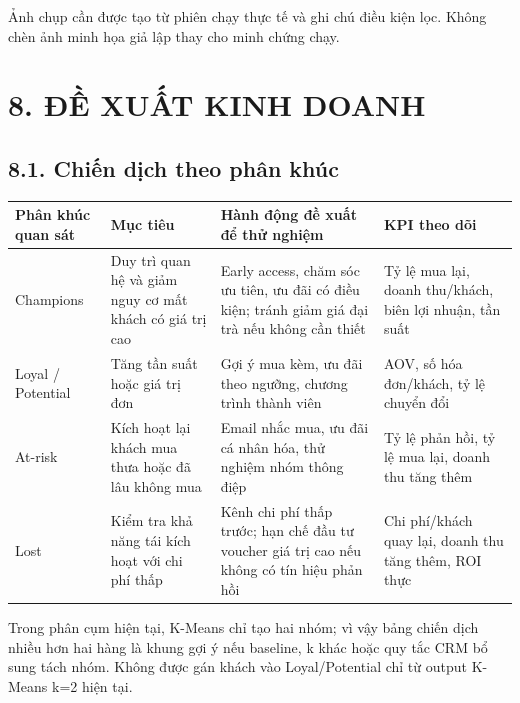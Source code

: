 \documentclass[a4paper]{article}
\begin{document}
Ảnh chụp cần được tạo từ phiên chạy thực tế và ghi chú điều kiện lọc. Không chèn ảnh minh họa giả lập thay cho minh chứng chạy.


\section*{8. ĐỀ XUẤT KINH DOANH}

\subsection*{8.1. Chiến dịch theo phân khúc}

\begin{table}[htbp]
\centering
\small
\begin{tabularx}{\textwidth}{|>{\raggedright\arraybackslash}X|>{\raggedright\arraybackslash}X|>{\raggedright\arraybackslash}X|>{\raggedright\arraybackslash}X|}
\hline
\textbf{Phân khúc quan sát} & \textbf{Mục tiêu} & \textbf{Hành động đề xuất để thử nghiệm} & \textbf{KPI theo dõi} \\
\hline
Champions & Duy trì quan hệ và giảm nguy cơ mất khách có giá trị cao & Early access, chăm sóc ưu tiên, ưu đãi có điều kiện; tránh giảm giá đại trà nếu không cần thiết & Tỷ lệ mua lại, doanh thu/khách, biên lợi nhuận, tần suất \\
\hline
Loyal / Potential & Tăng tần suất hoặc giá trị đơn & Gợi ý mua kèm, ưu đãi theo ngưỡng, chương trình thành viên & AOV, số hóa đơn/khách, tỷ lệ chuyển đổi \\
\hline
At-risk & Kích hoạt lại khách mua thưa hoặc đã lâu không mua & Email nhắc mua, ưu đãi cá nhân hóa, thử nghiệm nhóm thông điệp & Tỷ lệ phản hồi, tỷ lệ mua lại, doanh thu tăng thêm \\
\hline
Lost & Kiểm tra khả năng tái kích hoạt với chi phí thấp & Kênh chi phí thấp trước; hạn chế đầu tư voucher giá trị cao nếu không có tín hiệu phản hồi & Chi phí/khách quay lại, doanh thu tăng thêm, ROI thực \\
\hline
\end{tabularx}
\end{table}


Trong phân cụm hiện tại, K-Means chỉ tạo hai nhóm; vì vậy bảng chiến dịch nhiều hơn hai hàng là khung gợi ý nếu baseline, k khác hoặc quy tắc CRM bổ sung tách nhóm. Không được gán khách vào Loyal/Potential chỉ từ output K-Means k=2 hiện tại.
\end{document}

